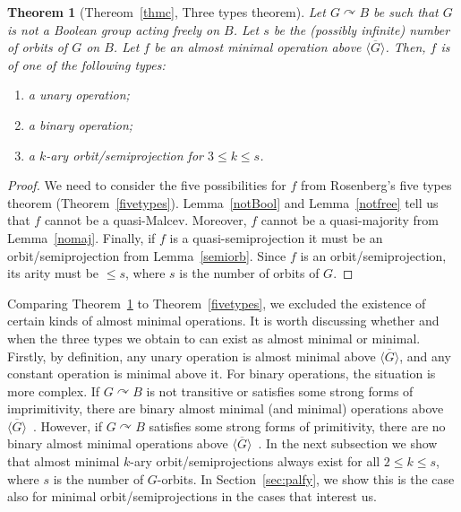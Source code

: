 \documentclass{article}
\newtheorem{theorem}{Theorem}[section]
\theoremstyle{remark}
\theoremstyle{definition}
\def\acts{\curvearrowright}
\begin{document}
\begin{theorem}[Thereom~\ref{thmc}, Three types theorem]\label{thm:threetypes} Let $G\acts B$ be such that $G$ is not a Boolean group acting freely on $B$. Let $s$ be the (possibly infinite) number of orbits of $G$ on $B$. Let $f$ be an almost minimal operation above $\overline{\langle G \rangle}$. Then, $f$ is of one of the following types:
\begin{enumerate}
    \item a unary operation;
    \item a binary operation;
    \item a $k$-ary orbit\-/semiprojection for $3\leq k \leq s$.
\end{enumerate}
\end{theorem}
\begin{proof} We need to consider the five possibilities for $f$ from Rosenberg's five types theorem (Theorem~\ref{fivetypes}). Lemma~\ref{notBool} and Lemma~\ref{notfree} tell us that $f$ cannot be a quasi-Malcev. Moreover, $f$ cannot be a quasi-majority from Lemma~\ref{nomaj}. Finally, if $f$ is a quasi-semiprojection it must be an orbit\-/semiprojection from Lemma~\ref{semiorb}. Since $f$ is an orbit\-/semiprojection, its arity must be $\leq s$, where $s$ is the number of orbits of $G$.
\end{proof}

Comparing Theorem~\ref{thm:threetypes} to Theorem~\ref{fivetypes}, we excluded the existence of certain kinds of almost minimal operations. It is worth discussing whether and when the three types we obtain to can exist as almost minimal or minimal. Firstly, by definition, any unary operation is almost minimal above $\overline{\langle G\rangle}$, and any constant operation is minimal above it. For binary operations, the situation is more complex. If $G\acts B$ is not transitive or satisfies some strong forms of imprimitivity, there are binary almost minimal (and minimal) operations above $\overline{\langle G\rangle}$~\cite{palfy1982contributions}. However, if $G\acts B$ satisfies some strong forms of primitivity, there are no binary almost minimal operations above  $\overline{\langle G\rangle}$~\cite{palfy1982contributions, kearnes2001collapsing}. In the next subsection we show that almost minimal $k$-ary orbit\-/semiprojections always exist for all $2\leq k\leq s$, where $s$ is the number of $G$-orbits. In Section~\ref{sec:palfy}, we show this is the case also for minimal orbit\-/semiprojections in the cases that interest us. 
\end{document}
